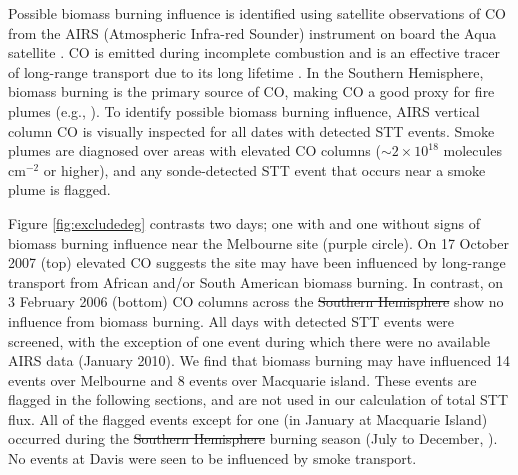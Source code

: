 \documentclass[acp, manuscript]{copernicus} %
\providecommand{\DIFadd}[1]{{\protect\color{blue}\uwave{#1}}} %
\providecommand{\DIFdel}[1]{{\protect\color{red}\sout{#1}}}                      %
\providecommand{\DIFaddbegin}{} %
\providecommand{\DIFaddend}{} %
\providecommand{\DIFdelbegin}{} %
\providecommand{\DIFdelend}{} %
\begin{document}
    Possible biomass burning influence is identified using satellite observations of CO from the AIRS (Atmospheric Infra-red Sounder) instrument on board the Aqua satellite \citep{AIRS3STD}.
    CO is emitted during incomplete combustion and is an effective tracer of long-range transport due to its long lifetime \citep{Edwards2003, Edwards2006}.
    In the Southern Hemisphere, biomass burning is the primary source of CO, making CO a good proxy for fire plumes (e.g., \citet{Sinha2004, Mari2008}).
    To identify possible biomass burning influence, AIRS vertical column CO is visually inspected for all dates with detected STT events.
    Smoke plumes are diagnosed over areas with elevated CO columns ($\sim 2 \times 10^{18}$ molecules cm$^{-2}$ or higher), and any sonde-detected STT event that occurs near a smoke plume is flagged.

    Figure \ref{fig:excludedeg} contrasts two days; one with and one without signs of biomass burning influence near the Melbourne site (purple circle).
    On 17 October 2007 (top) elevated CO suggests the site may have been influenced by long-range transport from African and/or South American biomass burning.
    In contrast, on 3 February 2006 (bottom) CO columns across the \DIFdelbegin \DIFdel{Southern Hemisphere }\DIFdelend \DIFaddbegin \DIFadd{SH }\DIFaddend show no influence from biomass burning.
    All days with detected STT events were screened, with the exception of one event during which there were no available AIRS data (January 2010).
    We find that biomass burning may have influenced 14 events over Melbourne and 8 events over Macquarie island.
    These events are flagged in the following sections, and are not used in our calculation of total STT flux.
    All of the flagged events except for one (in January at Macquarie Island) occurred during the \DIFdelbegin \DIFdel{Southern Hemisphere }\DIFdelend \DIFaddbegin \DIFadd{SH }\DIFaddend burning season (July to December, \citet{Edwards2006}). %
    No events at Davis were seen to be influenced by smoke transport.
\end{document}
